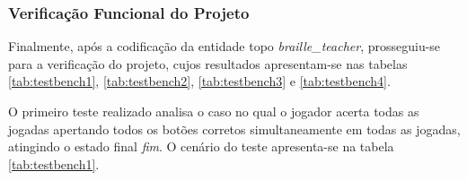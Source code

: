 \documentclass[amsmath,amssymb,floatfix]{report}
\begin{document}
\subsubsection{Verificação Funcional do Projeto}
\label{subsubsec:tbVhdl1}

Finalmente, após a codificação da entidade topo \textit{braille\_teacher}, prosseguiu-se para a verificação do projeto, cujos resultados apresentam-se nas tabelas \ref{tab:testbench1}, \ref{tab:testbench2}, \ref{tab:testbench3} e \ref{tab:testbench4}.

O primeiro teste realizado analisa o caso no qual o jogador acerta todas as jogadas apertando todos os botões corretos simultaneamente em todas as jogadas, atingindo o estado final \textit{fim}. O cenário do teste apresenta-se na tabela \ref{tab:testbench1}.
\end{document}
